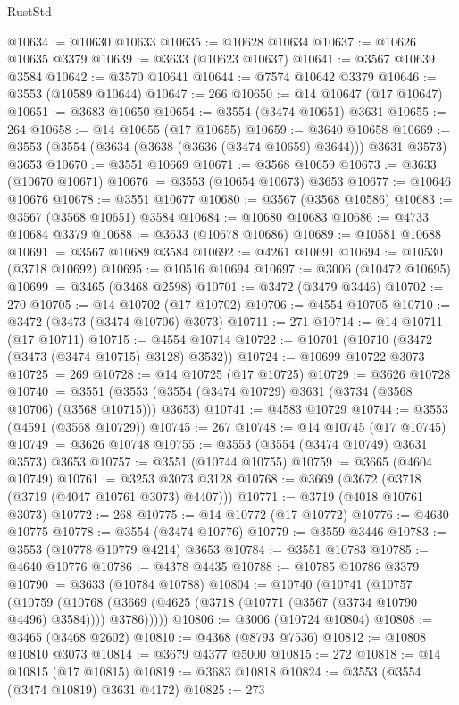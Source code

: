 \begin{lexlean}{RustStd}
\begin{coremodule}
@10634 := @10630 @10633
@10635 := @10628 @10634
@10637 := @10626 @10635 @3379
@10639 := @3633 (@10623 @10637)
@10641 := @3567 @10639 @3584
@10642 := @3570 @10641
@10644 := @7574 @10642 @3379
@10646 := @3553 (@10589 @10644)
@10647 := 266
@10650 := @14 @10647 (@17 @10647)
@10651 := @3683 @10650
@10654 := @3554 (@3474 @10651) @3631
@10655 := 264
@10658 := @14 @10655 (@17 @10655)
@10659 := @3640 @10658
@10669 := @3553 (@3554 (@3634 (@3638 (@3636 (@3474 @10659) @3644))) @3631 @3573) @3653
@10670 := @3551 @10669
@10671 := @3568 @10659
@10673 := @3633 (@10670 @10671)
@10676 := @3553 (@10654 @10673) @3653
@10677 := @10646 @10676
@10678 := @3551 @10677
@10680 := @3567 (@3568 @10586)
@10683 := @3567 (@3568 @10651) @3584
@10684 := @10680 @10683
@10686 := @4733 @10684 @3379
@10688 := @3633 (@10678 @10686)
@10689 := @10581 @10688
@10691 := @3567 @10689 @3584
@10692 := @4261 @10691
@10694 := @10530 (@3718 @10692)
@10695 := @10516 @10694
@10697 := @3006 (@10472 @10695)
@10699 := @3465 (@3468 @2598)
@10701 := @3472 (@3479 @3446)
@10702 := 270
@10705 := @14 @10702 (@17 @10702)
@10706 := @4554 @10705
@10710 := @3472 (@3473 (@3474 @10706) @3073)
@10711 := 271
@10714 := @14 @10711 (@17 @10711)
@10715 := @4554 @10714
@10722 := @10701 (@10710 (@3472 (@3473 (@3474 @10715) @3128) @3532))
@10724 := @10699 @10722 @3073
@10725 := 269
@10728 := @14 @10725 (@17 @10725)
@10729 := @3626 @10728
@10740 := @3551 (@3553 (@3554 (@3474 @10729) @3631 (@3734 (@3568 @10706) (@3568 @10715))) @3653)
@10741 := @4583 @10729
@10744 := @3553 (@4591 (@3568 @10729))
@10745 := 267
@10748 := @14 @10745 (@17 @10745)
@10749 := @3626 @10748
@10755 := @3553 (@3554 (@3474 @10749) @3631 @3573) @3653
@10757 := @3551 (@10744 @10755)
@10759 := @3665 (@4604 @10749)
@10761 := @3253 @3073 @3128
@10768 := @3669 (@3672 (@3718 (@3719 (@4047 @10761 @3073) @4407)))
@10771 := @3719 (@4018 @10761 @3073)
@10772 := 268
@10775 := @14 @10772 (@17 @10772)
@10776 := @4630 @10775
@10778 := @3554 (@3474 @10776)
@10779 := @3559 @3446
@10783 := @3553 (@10778 @10779 @4214) @3653
@10784 := @3551 @10783
@10785 := @4640 @10776
@10786 := @4378 @4435
@10788 := @10785 @10786 @3379
@10790 := @3633 (@10784 @10788)
@10804 := @10740
    (@10741
      (@10757
        (@10759
          (@10768 (@3669 (@4625 (@3718 (@10771 (@3567 (@3734 @10790 @4496) @3584)))) @3786)))))
@10806 := @3006 (@10724 @10804)
@10808 := @3465 (@3468 @2602)
@10810 := @4368 (@8793 @7536)
@10812 := @10808 @10810 @3073
@10814 := @3679 @4377 @5000
@10815 := 272
@10818 := @14 @10815 (@17 @10815)
@10819 := @3683 @10818
@10824 := @3553 (@3554 (@3474 @10819) @3631 @4172)
@10825 := 273

\end{coremodule}
\end{lexlean}
